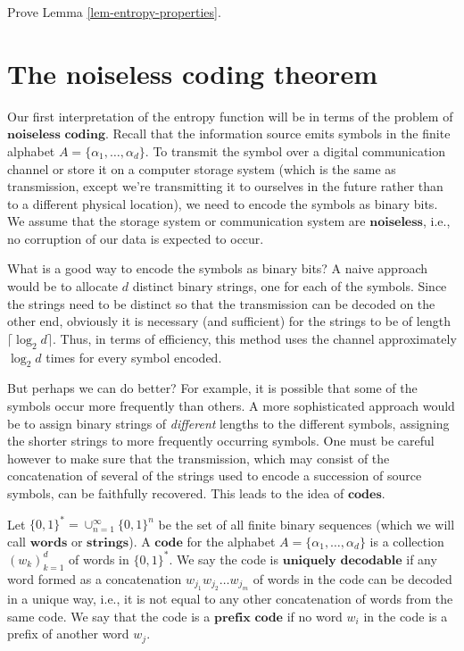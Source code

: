 \begin{xexercise}
Prove Lemma \ref{lem-entropy-properties}.
\end{xexercise}

\section{The noiseless coding theorem}
Our first interpretation of the entropy function will
be in terms of the problem of
$\textbf{noiseless coding}$. Recall that the
information source emits symbols in the finite
alphabet $A=\{\alpha_1,\ldots,\alpha_d\}$. To
transmit the symbol over a digital communication
channel or store it on a computer storage system
(which is the same as transmission, except we're
transmitting it to ourselves in the future rather than
to a different physical location), we need to encode
the symbols as binary bits. We assume that the storage
system or communication system are
$\textbf{noiseless}$, i.e., no corruption of our data
is expected to occur.

What is a good way to encode the symbols as binary
bits? A naive approach would be to allocate $d$
distinct binary strings, one for each of the symbols.
Since the strings need to be distinct so that the
transmission can be decoded on the other end,
obviously it is necessary (and sufficient) for the
strings to be of length $\lceil \log_2 d\rceil$.
Thus, in terms of efficiency, this method uses the
channel approximately $\log_2 d$ times for every
symbol encoded.

But perhaps we can do better? For example, it is
possible that some of the symbols occur more
frequently than others. A more sophisticated approach
would be to assign binary strings of \emph{different}
lengths to the different symbols, assigning the
shorter strings to more frequently occurring symbols.
One must be careful however to make sure that the
transmission, which may consist of the concatenation
of several of the strings used to encode a succession
of source symbols, can be faithfully recovered. This
leads to the idea of $\textbf{codes}$.

\begin{defn}
Let $\{0,1\}^*=\cup_{n=1}^\infty \{0,1\}^n$ be the
set of all finite binary sequences (which we will call
$\textbf{words}$ or $\textbf{strings}$). A
$\textbf{code}$ for the alphabet
$A=\{ \alpha_1,\ldots,\alpha_d\}$ is a collection
$(w_k)_{k=1}^d$ of words in $\{0,1\}^*$. We say the
code is $\textbf{uniquely decodable}$ if any word
formed as a concatenation
$w_{j_1}w_{j_2}\ldots w_{j_m}$ of words in the code
can be decoded in a unique way, i.e., it is not equal
to any other concatenation of words from the same
code. We say that the code is a $\textbf{prefix code}$
if no word $w_i$ in the code is a prefix of another
word $w_j$.
\end{defn}

